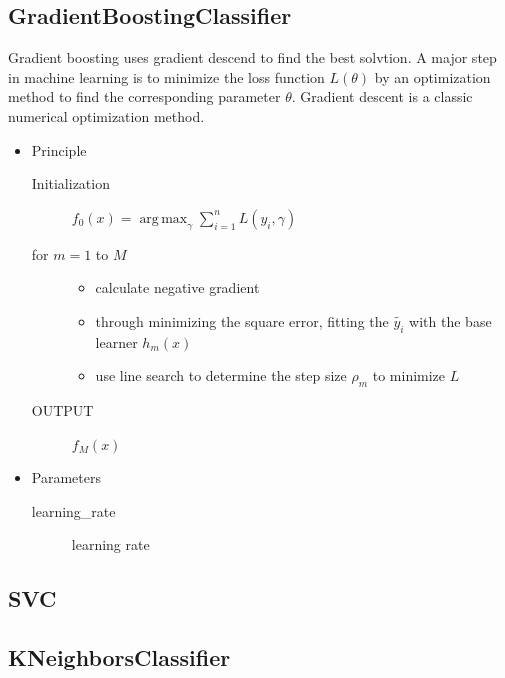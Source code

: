 \subsection{GradientBoostingClassifier}

Gradient boosting uses gradient descend 
to find the best solvtion.
A major step in machine learning is 
to minimize the loss function $L(θ)$ 
by an optimization method to 
find the corresponding parameter $θ$. 
Gradient descent is 
a classic numerical optimization method.

\begin{itemize}
	\item Principle
	
	\begin{description}
		\item[Initialization] $ f_{0}(x)=	
		\operatorname{arg\,max}_\gamma 
		\sum\nolimits_{i=1}^n L(y_i,\gamma)$
		
		\item[for $m=1$ to $M$] 
		
		\begin{itemize}
			\item calculate negative gradient
			\item through minimizing the square error, 
			fitting the $ \tilde{y_i} $ 
			with the base learner $h_m(x)$
			\item use line search to 
			determine the step size $\rho_m$ to minimize $L$
		\end{itemize}
		
		\item[OUTPUT] $f_M(x)$
	\end{description}
	
	\item Parameters
	
	\begin{description}
		\item[learning_rate] learning rate
	\end{description}
\end{itemize}
\subsection{SVC}


\subsection{KNeighborsClassifier}


